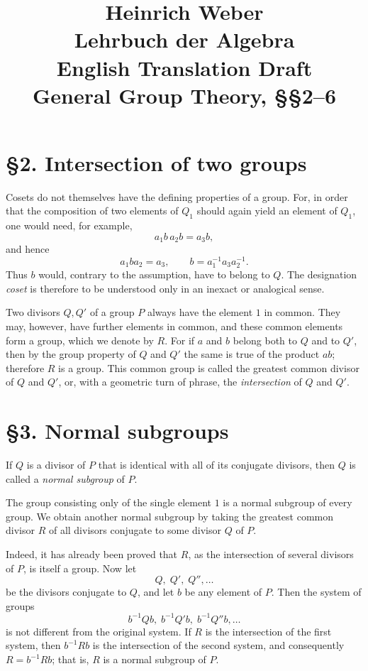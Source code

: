 \documentclass[11pt]{article}
\title{Heinrich Weber\\Lehrbuch der Algebra\\English Translation Draft\\General Group Theory, §§2--6}
\author{}
\date{}
\begin{document}
\maketitle

\section*{§2. Intersection of two groups}
Cosets do not themselves have the defining properties of a group. For, in order that the composition of two elements of $Q_1$ should again yield an element of $Q_1$, one would need, for example,
\[
 a_1 b\, a_2 b = a_3 b,
\]
and hence
\[
 a_1 b a_2 = a_3,
 \qquad
 b = a_1^{-1} a_3 a_2^{-1}.
\]
Thus $b$ would, contrary to the assumption, have to belong to $Q$. The designation \emph{coset} is therefore to be understood only in an inexact or analogical sense.

Two divisors $Q,Q'$ of a group $P$ always have the element $1$ in common. They may, however, have further elements in common, and these common elements form a group, which we denote by $R$. For if $a$ and $b$ belong both to $Q$ and to $Q'$, then by the group property of $Q$ and $Q'$ the same is true of the product $ab$; therefore $R$ is a group. This common group is called the greatest common divisor of $Q$ and $Q'$, or, with a geometric turn of phrase, the \emph{intersection} of $Q$ and $Q'$.

\section*{§3. Normal subgroups}
If $Q$ is a divisor of $P$ that is identical with all of its conjugate divisors, then $Q$ is called a \emph{normal subgroup} of $P$.

The group consisting only of the single element $1$ is a normal subgroup of every group. We obtain another normal subgroup by taking the greatest common divisor $R$ of all divisors conjugate to some divisor $Q$ of $P$.

Indeed, it has already been proved that $R$, as the intersection of several divisors of $P$, is itself a group. Now let
\[
 Q,\;Q',\;Q'',\dots
\]
be the divisors conjugate to $Q$, and let $b$ be any element of $P$. Then the system of groups
\[
 b^{-1}Qb,\; b^{-1}Q'b,\; b^{-1}Q''b,\dots
\]
is not different from the original system. If $R$ is the intersection of the first system, then $b^{-1}Rb$ is the intersection of the second system, and consequently $R=b^{-1}Rb$; that is, $R$ is a normal subgroup of $P$.
\end{document}
